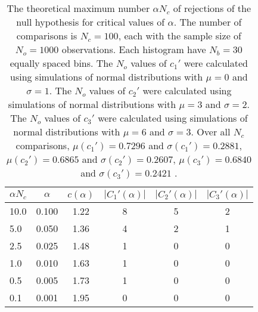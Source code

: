 \begin{table}[h!]
\begin{center}
\begin{tabular}{| l | c | c | c | c | c |}\hline
$\alpha N_c$ & $\alpha$ & $c(\alpha)$ & $|C_1'(\alpha)|$ & $|C_2'(\alpha)|$ & $|C_3'(\alpha)|$ \\\hline
10.0 & 0.100 & 1.22 & 8 & 5 & 2 \\\hline
5.0 & 0.050 & 1.36 & 4 & 2 & 1 \\\hline
2.5 & 0.025 & 1.48 & 1 & 0 & 0 \\\hline
1.0 & 0.010 & 1.63 & 1 & 0 & 0 \\\hline
0.5 & 0.005 & 1.73 & 1 & 0 & 0 \\\hline
0.1 & 0.001 & 1.95 & 0 & 0 & 0 \\\hline
\end{tabular}
\caption{The theoretical maximum number $\alpha N_c$ of rejections
of the null hypothesis for critical values of $\alpha$.
The number of comparisons is $N_c=100$,
each with the sample size of $N_o=1000$ observations.
Each histogram have $N_b=30$ equally spaced bins.
The $N_o$ values of $c_1'$ were calculated using simulations of
 normal distributions with $\mu=0$ and $\sigma=1$.
The $N_o$ values of $c_2'$ were calculated using simulations of
 normal distributions with $\mu=3$ and $\sigma=2$.
The $N_o$ values of $c_3'$ were calculated using simulations of
 normal distributions with $\mu=6$ and $\sigma=3$.
Over all $N_c$ comparisons,
 $\mu(c_1')=0.7296$ and $\sigma(c_1')=0.2881$,
 $\mu(c_2')=0.6865$ and $\sigma(c_2')=0.2607$,
 $\mu(c_3')=0.6840$ and $\sigma(c_3')=0.2421$ .
}
\end{center}
\end{table}